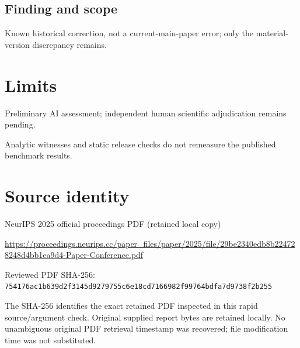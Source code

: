 \documentclass[11pt]{article}
\begin{document}
\subsection*{Finding and scope}

Known historical correction, not a current-main-paper error; only the material-version discrepancy remains.

\section*{Limits}

Preliminary AI assessment; independent human scientific adjudication remains pending.\par

Analytic witnesses and static release checks do not remeasure the published benchmark results.\par

\section*{Source identity}

NeurIPS 2025 official proceedings PDF (retained local copy)

\url{https://proceedings.neurips.cc/paper_files/paper/2025/file/29be2340edb8b224728248d4bb1ea9d4-Paper-Conference.pdf}

Reviewed PDF SHA-256: \nolinkurl{754176ac1b639d2f3145d9279755c6e18cd7166982f99764bdfa7d9738f2b255}

The SHA-256 identifies the exact retained PDF inspected in this rapid source/argument check. Original supplied report bytes are retained locally. No unambiguous original PDF retrieval timestamp was recovered; file modification time was not substituted.
\end{document}
